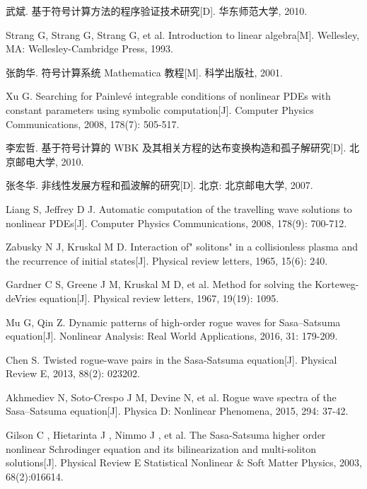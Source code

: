 \cleardoublepage
{}
{}
\nocite{*}
%

\begin{thebibliography}{0}

武斌. 基于符号计算方法的程序验证技术研究[D]. 华东师范大学, 2010.

Strang G, Strang G, Strang G, et al. Introduction to linear algebra[M]. Wellesley, MA: Wellesley-Cambridge Press, 1993.

张韵华. 符号计算系统 Mathematica 教程[M]. 科学出版社, 2001.

Xu G. Searching for Painlevé integrable conditions of nonlinear PDEs with constant parameters using symbolic computation[J]. Computer Physics Communications, 2008, 178(7): 505-517.

李宏哲. 基于符号计算的 WBK 及其相关方程的达布变换构造和孤子解研究[D]. 北京邮电大学, 2010.

张冬华. 非线性发展方程和孤波解的研究[D]. 北京: 北京邮电大学, 2007.

Liang S, Jeffrey D J. Automatic computation of the travelling wave solutions to nonlinear PDEs[J]. Computer Physics Communications, 2008, 178(9): 700-712.

Zabusky N J, Kruskal M D. Interaction of" solitons" in a collisionless plasma and the recurrence of initial states[J]. Physical review letters, 1965, 15(6): 240.

Gardner C S, Greene J M, Kruskal M D, et al. Method for solving the Korteweg-deVries equation[J]. Physical review letters, 1967, 19(19): 1095.

Mu G, Qin Z. Dynamic patterns of high-order rogue waves for Sasa–Satsuma equation[J]. Nonlinear Analysis: Real World Applications, 2016, 31: 179-209.

Chen S. Twisted rogue-wave pairs in the Sasa-Satsuma equation[J]. Physical Review E, 2013, 88(2): 023202.

Akhmediev N, Soto-Crespo J M, Devine N, et al. Rogue wave spectra of the Sasa–Satsuma equation[J]. Physica D: Nonlinear Phenomena, 2015, 294: 37-42.



Gilson C , Hietarinta J , Nimmo J , et al. The Sasa-Satsuma higher order nonlinear Schrodinger equation and its bilinearization and multi-soliton solutions[J]. Physical Review E Statistical Nonlinear \& Soft Matter Physics, 2003, 68(2):016614.


\end{thebibliography}
